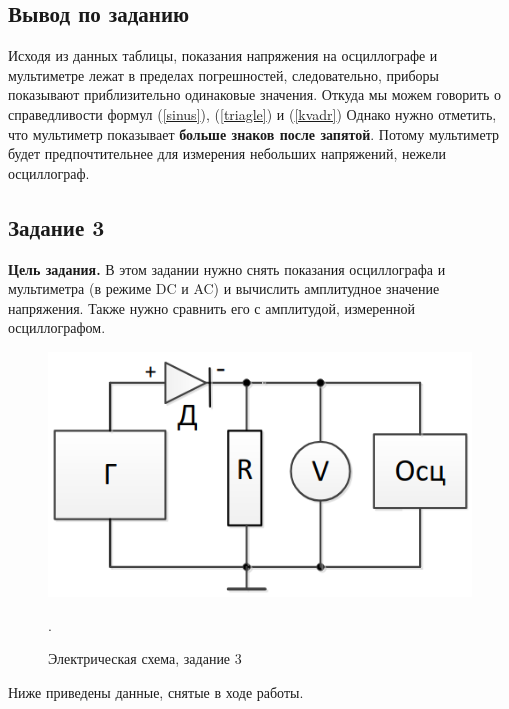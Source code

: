 \documentclass[a4paper,12pt]{article}
\begin{document}
\newpage
\subsection{Вывод по заданию}

\hspace{\parindent}Исходя из данных таблицы, показания напряжения на осциллографе и мультиметре лежат в пределах погрешностей, следовательно, приборы показывают приблизительно одинаковые значения. Откуда мы можем говорить о справедливости формул (\ref{sinus}), (\ref{triagle}) и (\ref{kvadr})
Однако нужно отметить, что мультиметр показывает \textbf{больше знаков после запятой}. Потому мультиметр будет предпочтительнее для измерения небольших напряжений, нежели осциллограф.


\subsection{Задание 3}
\textbf{Цель задания.} В этом задании нужно снять показания осциллографа и мультиметра (в режиме DC и AC) и вычислить амплитудное значение напряжения. Также нужно сравнить его с амплитудой, измеренной осциллографом.

\begin{figure}[h]
	\begin{center}
		\includegraphics[scale=0.4]{scheme_3.png}
	\end{center}
	\caption{Электрическая схема, задание 3}.
\end{figure}

Ниже приведены данные, снятые в ходе работы.
\end{document}
